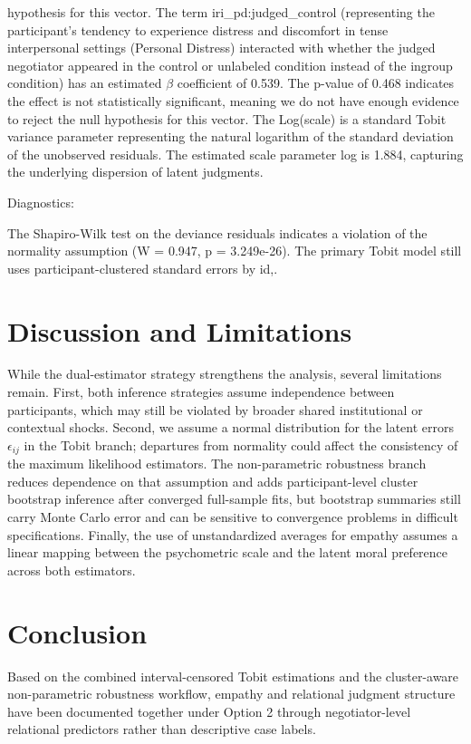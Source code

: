 \documentclass[11pt]{article}
\begin{document}
hypothesis for this vector. The term iri\_pd:judged\_control (representing the participant's tendency to experience distress and discomfort in tense interpersonal settings (Personal Distress) interacted with whether the judged negotiator appeared in the control or unlabeled condition instead of the ingroup condition) has an estimated $\beta$ coefficient of 0.539. The p-value of 0.468 indicates the effect is not statistically significant, meaning we do not have enough evidence to reject the null hypothesis for this vector. The Log(scale) is a standard Tobit variance parameter representing the natural logarithm of the standard deviation of the unobserved residuals. The estimated scale parameter log is 1.884, capturing the underlying dispersion of latent judgments.

Diagnostics:

The Shapiro-Wilk test on the deviance residuals indicates a violation of the normality assumption (W = 0.947, p = 3.249e-26). The primary Tobit model still uses participant-clustered standard errors by id,.



\section{Discussion and Limitations}
While the dual-estimator strategy strengthens the analysis, several limitations remain. First, both inference strategies assume  independence between participants, which may still be violated by broader shared institutional or contextual shocks. Second, we assume a  normal distribution for the latent errors $\epsilon_{ij}$ in the Tobit branch; departures from normality could affect the consistency of  the maximum likelihood estimators. The non-parametric robustness branch reduces dependence on that assumption and adds participant-level cluster bootstrap inference after converged full-sample fits, but bootstrap summaries still carry Monte Carlo error and can be sensitive to convergence problems in difficult specifications.  Finally, the use of unstandardized averages for empathy assumes a linear mapping between the psychometric scale and the latent moral preference across both estimators.

\section{Conclusion}
Based on the combined interval-censored Tobit estimations and the cluster-aware non-parametric robustness workflow, empathy and relational judgment structure have been documented together under Option 2 through negotiator-level relational predictors rather than descriptive case labels.
\end{document}
